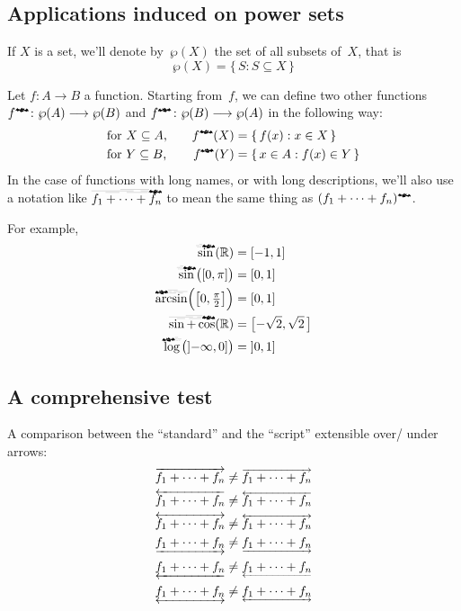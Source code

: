 \documentclass[a4paper]{article}
\begin{document}
\subsection{Applications induced on power sets}

If $X$ is a set, we'll denote by~$\wp(X)$ the set of all subsets of~$X$, that is
\[
	\wp(X) = \{\,S:S\subseteq X\,\}
\]

Let \( f\colon A\longrightarrow B \) a function.  Starting from~$f$, we can
define two other functions \( f^{\mathrightbat} \colon \wp(A) \longrightarrow
\wp(B) \) and \( f^{\mathleftbat} \colon \wp(B) \longrightarrow \wp(A) \) in the
following way:
\begin{alignat}{2}
	&\text{for $X\subseteq A$,}\quad
		&f^{\mathrightbat}(X) &= \{\,f(x):x\in X\,\} \\
	&\text{for $Y\subseteq B$,}\quad
		&f^{\mathleftbat}(Y) &= \{\,x\in A:f(x)\in Y\,\}
\end{alignat}
In the case of functions with long names, or with long descriptions, we'll also
use a notation like \( \overrightflutteringbat{f_{1}+\dots+f_{n}} \) to mean the
same thing as \( (f_{1}+\dots+f_{n})^{\mathrightbat} \).

For example,
\begin{align*}
	\mathop{\overrightflutteringbat{\sin}}(\mathbb{R}) &= [-1,1] \\
	\mathop{\overrightflutteringbat{\sin}}\bigl([0,\pi]\bigr) &= [0,1] \\
	\mathop{\overleftflutteringbat{\arcsin}}
				\Bigl(\bigl[0,\tfrac{\pi}{2}\bigr]\Bigr) &= [0,1] \\
	\mathop{\overrightflutteringbat{\sin+\cos}}(\mathbb{R})
		&= \bigl[-\sqrt{2},\sqrt{2}\,\bigr] \\
	\mathop{\overleftflutteringbat{\log}}\bigl(\mathopen]-\infty,0]\bigr)
		&= \mathopen]0,1]
\end{align*}



\subsection{A comprehensive test}

A comparison between the ``standard'' and the ``script'' extensible over\slash
under arrows:
\begin{align*}
	\overrightarrow{f_{1}+\dots+f_{n}}
		&\neq\overscriptrightarrow{f_{1}+\dots+f_{n}}  \\
	\overleftarrow{f_{1}+\dots+f_{n}}
		&\neq\overscriptleftarrow{f_{1}+\dots+f_{n}}  \\
	\overleftrightarrow{f_{1}+\dots+f_{n}}
		&\neq\overscriptleftrightarrow{f_{1}+\dots+f_{n}}  \\
	\underrightarrow{f_{1}+\dots+f_{n}}
		&\neq\underscriptrightarrow{f_{1}+\dots+f_{n}}  \\
	\underleftarrow{f_{1}+\dots+f_{n}}
		&\neq\underscriptleftarrow{f_{1}+\dots+f_{n}}  \\
	\underleftrightarrow{f_{1}+\dots+f_{n}}
		&\neq\underscriptleftrightarrow{f_{1}+\dots+f_{n}}
\end{align*}
\end{document}
